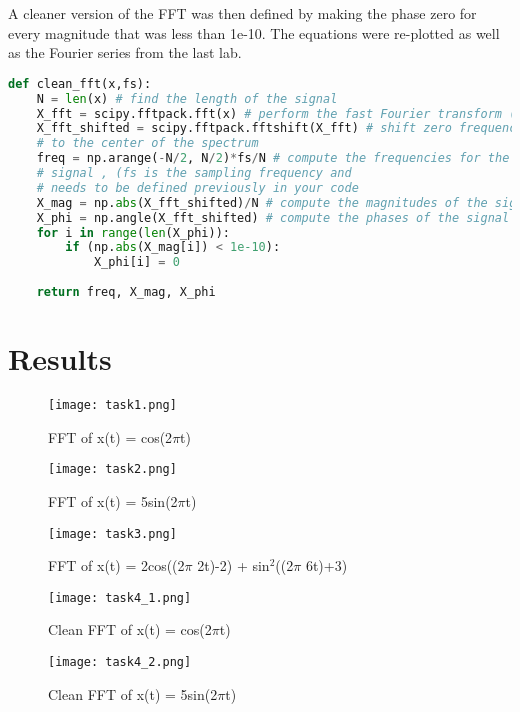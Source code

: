 \documentclass[12pt]{report}
\begin{document}
A cleaner version of the FFT was then defined by making the phase zero for every magnitude that was less than 1e-10. The equations were re-plotted as well as the Fourier series from the last lab.

\begin{lstlisting}[language=Python, caption=Clean FFT]
def clean_fft(x,fs):
    N = len(x) # find the length of the signal
    X_fft = scipy.fftpack.fft(x) # perform the fast Fourier transform (fft)
    X_fft_shifted = scipy.fftpack.fftshift(X_fft) # shift zero frequency components
    # to the center of the spectrum
    freq = np.arange(-N/2, N/2)*fs/N # compute the frequencies for the output
    # signal , (fs is the sampling frequency and
    # needs to be defined previously in your code
    X_mag = np.abs(X_fft_shifted)/N # compute the magnitudes of the signal
    X_phi = np.angle(X_fft_shifted) # compute the phases of the signal
    for i in range(len(X_phi)):
        if (np.abs(X_mag[i]) < 1e-10):
            X_phi[i] = 0
    
    return freq, X_mag, X_phi
\end{lstlisting}


\section{Results}

\begin{figure}[htp]
    \centering
    \texttt{[image: task1.png]}
    \caption{FFT of x(t) = cos(2$\pi$t)}
\end{figure}

\begin{figure}[htp]
    \centering
    \texttt{[image: task2.png]}
    \caption{FFT of x(t) = 5sin(2$\pi$t)}
\end{figure}

\begin{figure}[htp]
    \centering
    \texttt{[image: task3.png]}
    \caption{FFT of x(t) = 2cos((2$\pi$ 2t)-2) + sin$^2$((2$\pi$ 6t)+3)}
\end{figure}

\begin{figure}[htp]
    \centering
    \texttt{[image: task4\_1.png]}
    \caption{Clean FFT of x(t) = cos(2$\pi$t)}
\end{figure}

\begin{figure}[htp]
    \centering
    \texttt{[image: task4\_2.png]}
    \caption{Clean FFT of x(t) = 5sin(2$\pi$t)}
\end{figure}
\end{document}
